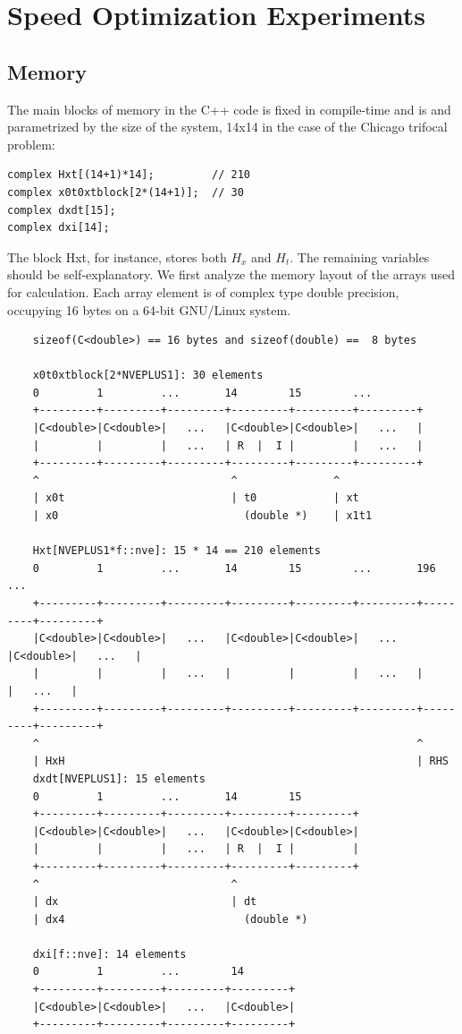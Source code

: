 \section{Speed Optimization Experiments}

\subsection{Memory}
The main blocks of memory in the C++ code is fixed in compile-time and is and
parametrized by the size of the system, 14x14 in the case of the Chicago
trifocal problem:
\begin{verbatim}
complex Hxt[(14+1)*14];         // 210
complex x0t0xtblock[2*(14+1)];  // 30
complex dxdt[15];           
complex dxi[14];
\end{verbatim}
The block Hxt, for instance, stores both $H_x$ and $H_t$. The remaining
variables should be self-explanatory.
We first analyze the memory layout of the arrays used for calculation. Each
array element is of complex type double precision, occupying 16 bytes on a
64-bit GNU/Linux system.
\tiny\begin{verbatim}
    sizeof(C<double>) == 16 bytes and sizeof(double) ==  8 bytes

    x0t0xtblock[2*NVEPLUS1]: 30 elements
    0         1         ...       14        15        ...
    +---------+---------+---------+---------+---------+---------+
    |C<double>|C<double>|   ...   |C<double>|C<double>|   ...   |
    |         |         |   ...   | R  |  I |         |   ...   |
    +---------+---------+---------+---------+---------+---------+
    ^                              ^               ^
    | x0t                          | t0            | xt
    | x0                             (double *)    | x1t1

    Hxt[NVEPLUS1*f::nve]: 15 * 14 == 210 elements
    0         1         ...       14        15        ...       196       ...
    +---------+---------+---------+---------+---------+---------+---------+---------+
    |C<double>|C<double>|   ...   |C<double>|C<double>|   ...   |C<double>|   ...   |
    |         |         |   ...   |         |         |   ...   |         |   ...   |
    +---------+---------+---------+---------+---------+---------+---------+---------+
    ^                                                           ^
    | HxH                                                       | RHS
    dxdt[NVEPLUS1]: 15 elements
    0         1         ...       14        15
    +---------+---------+---------+---------+---------+
    |C<double>|C<double>|   ...   |C<double>|C<double>|
    |         |         |   ...   | R  |  I |         |
    +---------+---------+---------+---------+---------+
    ^                              ^
    | dx                           | dt
    | dx4                            (double *)

    dxi[f::nve]: 14 elements
    0         1         ...        14
    +---------+---------+---------+---------+
    |C<double>|C<double>|   ...   |C<double>|
    +---------+---------+---------+---------+
\end{verbatim}
\normalsize

